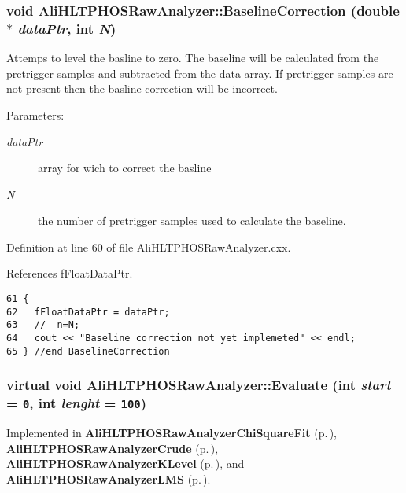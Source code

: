 \subsubsection{\setlength{\rightskip}{0pt plus 5cm}void Ali\-HLTPHOSRaw\-Analyzer::Baseline\-Correction (double $\ast$ {\em data\-Ptr}, int {\em N})}\label{classAliHLTPHOSRawAnalyzer_AliHLTPHOSRawAnalyzerPeakFindera7}


Attemps to level the basline to zero. The baseline will be calculated from the pretrigger samples and subtracted from the data array. If pretrigger samples are not present then the basline correction will be incorrect. \begin{Desc}
\item[Parameters:]
\begin{description}
\item[{\em data\-Ptr}]array for wich to correct the basline \item[{\em N}]the number of pretrigger samples used to calculate the baseline. \end{description}
\end{Desc}


Definition at line 60 of file Ali\-HLTPHOSRaw\-Analyzer.cxx.

References f\-Float\-Data\-Ptr.

\footnotesize\begin{verbatim}61 {
62   fFloatDataPtr = dataPtr;  
63   //  n=N;
64   cout << "Baseline correction not yet implemeted" << endl;
65 } //end BaselineCorrection
\end{verbatim}\normalsize 


\subsubsection{\setlength{\rightskip}{0pt plus 5cm}virtual void Ali\-HLTPHOSRaw\-Analyzer::Evaluate (int {\em start} = {\tt 0}, int {\em lenght} = {\tt 100})\hspace{0.3cm}{\tt  [pure virtual]}}\label{classAliHLTPHOSRawAnalyzer_AliHLTPHOSRawAnalyzerPeakFindera17}




Implemented in {\bf Ali\-HLTPHOSRaw\-Analyzer\-Chi\-Square\-Fit} {\rm (p.\,\pageref{classAliHLTPHOSRawAnalyzerChiSquareFit_AliHLTPHOSRawAnalyzerChiSquareFita4})}, {\bf Ali\-HLTPHOSRaw\-Analyzer\-Crude} {\rm (p.\,\pageref{classAliHLTPHOSRawAnalyzerCrude_AliHLTPHOSRawAnalyzerCrudea4})}, {\bf Ali\-HLTPHOSRaw\-Analyzer\-KLevel} {\rm (p.\,\pageref{classAliHLTPHOSRawAnalyzerKLevel_AliHLTPHOSRawAnalyzerKLevela4})}, and {\bf Ali\-HLTPHOSRaw\-Analyzer\-LMS} {\rm (p.\,\pageref{classAliHLTPHOSRawAnalyzerLMS_AliHLTPHOSRawAnalyzerLMSa5})}.
